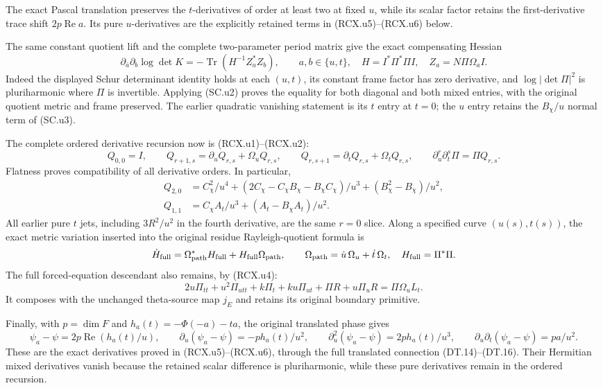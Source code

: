 The exact Pascal translation preserves the \(t\)-derivatives
of order at least two at fixed \(u\), while its scalar factor
retains the first-derivative trace shift
\(2p\operatorname{Re}a\).  Its pure \(u\)-derivatives are
the explicitly retained terms in (RCX.u5)--(RCX.u6) below.

The same constant quotient lift and the complete two-parameter
period matrix give the exact compensating Hessian
\[
 \partial_{\bar a}\partial_b\log\det K
    =-\operatorname{Tr}(H^{-1}Z_a^*Z_b),\qquad
 a,b\in\{u,t\},\quad
 H=I^*\Pi^*\Pi I,\quad
 Z_a=N\Pi\Omega_a I .
\]
Indeed the displayed Schur determinant identity holds at
each \((u,t)\), its constant frame factor has zero
derivative, and \(\log|\det\Pi|^2\) is pluriharmonic
where \(\Pi\) is invertible.  Applying (SC.u2) proves
the equality for both diagonal and both mixed entries,
with the original quotient metric and frame preserved.
The earlier quadratic vanishing statement is its \(t\)
entry at \(t=0\); the \(u\) entry retains the
\(B_\chi/u\) normal term of (SC.u3).

The complete ordered derivative recursion now is
(RCX.u1)--(RCX.u2):
\[
 Q_{0,0}=I,\qquad
 Q_{r+1,s}=\partial_uQ_{r,s}+\Omega_uQ_{r,s},\qquad
 Q_{r,s+1}=\partial_tQ_{r,s}+\Omega_tQ_{r,s},\qquad
 \partial_u^r\partial_t^s\Pi=\Pi Q_{r,s}.
\]
Flatness proves compatibility of all derivative orders.
In particular,
\[
 \begin{aligned}
 Q_{2,0}
   &=C_\chi^2/u^4+
       (2C_\chi-C_\chi B_\chi-B_\chi C_\chi)/u^3
                       +(B_\chi^2-B_\chi)/u^2,\\
 Q_{1,1}
   &=C_\chi A_t/u^3+(A_t-B_\chi A_t)/u^2.
 \end{aligned}
\]
All earlier pure \(t\) jets, including \(3R^2/u^2\)
in the fourth derivative, are the same \(r=0\) slice.
Along a specified curve \((u(s),t(s))\), the exact
metric variation inserted into the original residue
Rayleigh-quotient formula is
\[
 \dot H_{\rm full}
   =\Omega_{\rm path}^*H_{\rm full}
            +H_{\rm full}\Omega_{\rm path},\qquad
 \Omega_{\rm path}=\dot u\,\Omega_u+\dot t\,\Omega_t,
 \quad H_{\rm full}=\Pi^*\Pi .
\]
The full forced-equation descendant also remains, by (RCX.u4):
\[
 2u\Pi_{tt}+u^2\Pi_{utt}+k\Pi_t+ku\Pi_{ut}
       +\Pi R+u\Pi_uR=\Pi\Omega_u L_t.
\]
It composes with the unchanged theta-source map \(j_E\)
and retains its original boundary primitive.

Finally, with \(p=\dim F\) and
\(h_a(t)=-\Phi(-a)-ta\), the original translated phase gives
\[
 \psi_a-\psi=2p\operatorname{Re}(h_a(t)/u),\qquad
 \partial_u(\psi_a-\psi)=-p h_a(t)/u^2,\qquad
 \partial_u^2(\psi_a-\psi)=2p h_a(t)/u^3,\qquad
 \partial_u\partial_t(\psi_a-\psi)=pa/u^2 .
\]
These are the exact derivatives proved in
(RCX.u5)--(RCX.u6), through the full translated
connection (DT.14)--(DT.16).  Their Hermitian mixed
derivatives vanish because the retained scalar
difference is pluriharmonic, while these pure
derivatives remain in the ordered recursion.
